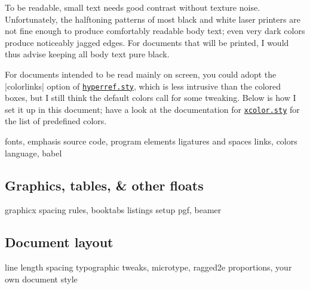 \documentclass[a4paper,twoside,nofonts]{tufte-handout}
\makeatletter
\newcommand\code[1]{\texttt{#1}}
\let\file\code
\def\ctan@prefix{http://ctan.tug.org/pkg/}
\newcommand\package[2][\@empty]{%
  \href{\ctan@prefix #2}{\file{\ifx #1\@empty #2.sty\else #1\fi}}}
\makeatother
\begin{document}
To be readable, small text needs good contrast without texture noise.
Unfortunately, the halftoning patterns of most black and white laser printers are not fine enough to produce comfortably readable body text; even very dark colors produce noticeably jagged edges.
For documents that will be printed, I would thus advise keeping all body text pure black.

For documents intended to be read mainly on screen, you could adopt the |colorlinks| option of \package{hyperref}, which is less intrusive than the colored boxes, but I still think the default colors call for some tweaking.
Below is how I set it up in this document; have a look at the documentation for \package{xcolor} for the list of predefined colors.
\begin{latexcode}
  \hypersetup{
    breaklinks, colorlinks,
    urlcolor=externallinkcolor,
    filecolor=externallinkcolor,
    linkcolor=internallinkcolor,
    citecolor=internallinkcolor,
  }
\end{latexcode}

\begin{todoenv}
    fonts, emphasis
    source code, program elements
    ligatures and spaces
    links, colors
    language, babel
\end{todoenv}

\subsection{Graphics, tables, \& other floats} %
\label{sec:graphics}

\cite{tufte}

\begin{todoenv}
    graphicx
    spacing
    rules, booktabs
    listings setup
    pgf, beamer
\end{todoenv}

\subsection{Document layout} %
\label{sec:layout}

\cite{bringhurst,designingbooks}

\begin{todoenv}
    line length
    spacing
    typographic tweaks, microtype, ragged2e
    proportions, your own document style
\end{todoenv}
\end{document}
